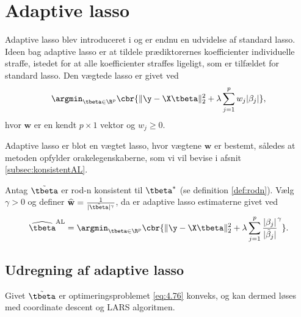 \section{Adaptive lasso}
Adaptive lasso blev introduceret i \citep{adaptive_lasso} og er endnu en udvidelse af standard lasso.
Ideen bag adaptive lasso er at tildele prædiktorernes koefficienter individuelle straffe, istedet for at alle koefficienter straffes ligeligt, som er tilfældet for standard lasso.
Den vægtede lasso er givet ved
\begin{align*}
\argmin_{\tbeta \in \R^p} \cbr{\Vert \y - \X \tbeta \Vert_2^2 + \lambda \sum_{j=1}^p w_j \vert \beta_j \vert},
\end{align*}
hvor \(\mathbf{w}\) er en kendt \(p \times 1\) vektor og \(w_j \geq 0\).

Adaptive lasso er blot en vægtet lasso, hvor vægtene \(\mathbf{w}\) er bestemt, således at metoden opfylder orakelegenskaberne, som vi vil bevise i afsnit \ref{subsec:konsistentAL}.
\begin{defn}
Antag \(\tilde{\tbeta}\) er rod-n konsistent til \(\tbeta^*\) (se definition \ref{def:rodn}).
Vælg \(\gamma>0\) og definer \(\widehat{\mathbf{w}} = \frac{1}{\vert \tilde{\tbeta} \vert^\gamma}\), da er adaptive lasso estimaterne givet ved
\begin{align}
\widehat{\tbeta}^\text{AL} = \argmin_{\tbeta \in \R^p} \cbr{ \Vert \y - \X \tbeta \Vert_2^2 + \lambda \sum_{j=1}^p \frac{ \vert \beta_j \vert}{\vert \tilde{\beta}_j \vert }^\gamma}. \label{eq:4.76}
\end{align}
\end{defn}

\subsection{Udregning af adaptive lasso}
Givet \(\tilde{\tbeta}\) er optimeringsproblemet \eqref{eq:4.76} konveks, og kan dermed løses med coordinate descent og LARS algoritmen.
